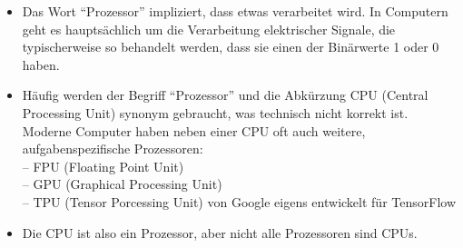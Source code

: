 	\begin{itemize}
		\item Das Wort “Prozessor” impliziert, dass etwas verarbeitet wird. In Computern geht es hauptsächlich um die Verarbeitung elektrischer Signale, die typischerweise so behandelt werden, dass sie einen der Binärwerte 1 oder 0 haben.
		\item Häufig werden der Begriff “Prozessor” und die Abkürzung CPU (Central Processing Unit) synonym gebraucht, was technisch nicht korrekt ist. Moderne Computer haben neben einer CPU oft auch weitere, aufgabenspezifische Prozessoren:\\
		--  FPU (Floating Point Unit)\\
		-- GPU (Graphical Processing Unit)\\
		-- TPU (Tensor Porcessing Unit) von Google eigens entwickelt für TensorFlow
		\item Die CPU ist also ein Prozessor, aber nicht alle Prozessoren sind CPUs.
	\end{itemize}



